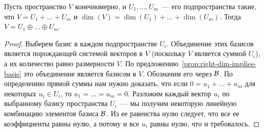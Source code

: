 \begin{proposition}
Пусть пространство $V$ конечномерно, и $U_1,\dots,U_m$~--- его
подпространства такие, что $V = U_1 + \dots + U_m$
и $\dim(V) = \dim(U_1) + \dots + \dim(U_m)$.
Тогда $V = U_1\oplus \dots \oplus U_m$.
\end{proposition}
\begin{proof}
Выберем базис в каждом подпространстве $U_i$. Объединение этих
базисов является порождающей системой векторов в $V$
(поскольку $V$ является суммой $U_i$), а их количество
равно размерности $V$. По предложению~\ref{prop:right-dim-implies-basis}
это объединение является базисом в $V$. Обозначим его через $\mathcal B$.
По определению прямой суммы нам нужно доказать, что если
$0 = u_1+\dots+u_m$ для некоторых $u_i\in U_i$, то $u_1=\dots=u_m=0$.
Разложим каждый вектор $u_i$ по выбранному базису пространства
$U_i$~--- мы получим некоторую линейную комбинацию элементов
базиса $\mathcal B$. Из ее равенства нулю следует, что все ее коэффициенты
равны нулю, а потому и все $u_i$ равны нулю, что и требовалось.
\end{proof}
